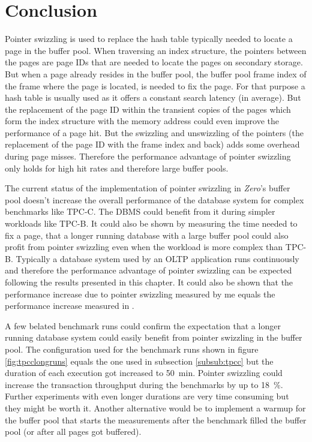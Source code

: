 \section{Conclusion}

    Pointer swizzling is used to replace the hash table typically needed to locate a page in the buffer pool. When traversing an index structure, the pointers between the pages are page IDs that are needed to locate the pages on secondary storage. But when a page already resides in the buffer pool, the buffer pool frame index of the frame where the page is located, is needed to fix the page. For that purpose a hash table is usually used as it offers a constant search latency (in average). But the replacement of the page ID within the transient copies of the pages which form the index structure with the memory address could even improve the performance of a page hit. But the swizzling and unswizzling of the pointers (the replacement of the page ID with the frame index and back) adds some overhead during page misses. Therefore the performance advantage of pointer swizzling only holds for high hit rates and therefore large buffer pools.

    The current status of the implementation of pointer swizzling in \emph{Zero}'s buffer pool doesn't increase the overall performance of the database system for complex benchmarks like TPC-C. The DBMS could benefit from it during simpler workloads like TPC-B. It could also be shown by measuring the time needed to fix a page, that a longer running database with a large buffer pool could also profit from pointer swizzling even when the workload is more complex than TPC-B. Typically a database system used by an OLTP application runs continuously and therefore the performance advantage of pointer swizzling can be expected following the results presented in this chapter. It could also be shown that the performance increase due to pointer swizzling measured by me equals the performance increase measured in \cite{Graefe:2014}.

    A few belated benchmark runs could confirm the expectation that a longer running database system could easily benefit from pointer swizzling in the buffer pool. The configuration used for the benchmark runs shown in figure \ref{fig:tpcclongruns} equals the one used in subsection \ref{subsub:tpcc} but the duration of each execution got increased to \SI{50}{\minute}. Pointer swizzling could increase the transaction throughput during the benchmarks by up to \SI{18}{\percent}. Further experiments with even longer durations are very time consuming but they might be worth it. Another alternative would be to implement a warmup for the buffer pool that starts the measurements after the benchmark filled the buffer pool (or after all pages got buffered).

